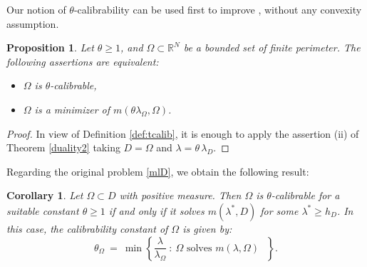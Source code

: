 \documentclass[reqno,11pt]{amsart}
\newtheorem{proposition}[theorem]{Proposition}
\newtheorem{corollary}[theorem]{Corollary}
\theoremstyle{definition}
\numberwithin{equation}{section}
\newcommand{\RR}{\mathbb{R}}
\newcommand{\1}{{{\bf 1}\kern-0,28em\rm l}}
\def\O{\Omega}
\def\l{\lambda}
\begin{document}
Our notion of $\theta$-calibrability can be used first to improve  \cite[Proposition 2]{alter2005characterization},
without any convexity assumption. 


\begin{proposition}\label{mlDtheta}
Let $\theta \ge 1$, and $\Omega \subset \RR^N$ be a bounded  set of finite perimeter. The following assertions are equivalent:
\begin{itemize}
\item[(i)] $\Omega$ is $\theta$-calibrable,
\item[(ii)] $\Omega$ is a minimizer of $m(\theta\lambda_\Omega,\Omega)$.
\end{itemize}
\end{proposition}

\begin{proof} In view of Definition \ref{def:tcalib}, it is enough to apply the assertion (ii) of Theorem \ref{duality2} taking $D=\O$ and $\l= \theta\, \l_D$.

\end{proof}

Regarding the original problem \eqref{mlD}, we obtain the following result:
\begin{corollary}\label{theta-min}
Let $\Omega\subset D$ with positive measure. Then $\O$ is $\theta$-calibrable for a suitable constant $\theta\ge 1$ if and only if it solves  $m(\lambda^*,D)$ for some $\lambda^*\ge h_D$. In this case,  the calibrability constant of $\O$ is given by:
\begin{equation}\label{minlambda}
 \theta_\O \ =\ \min \left\{ \frac{\l}{\l_\Omega}\ :  \ \text{$\O$ solves $m(\l,\O)$ } \right\} .
\end{equation}

\end{corollary}
\end{document}
